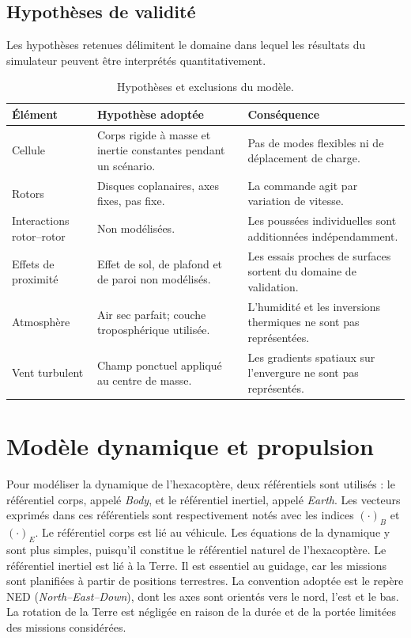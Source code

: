 \documentclass[11pt,a4paper,oneside]{report}
\begin{document}
	\section{Hypothèses de validité}
	Les hypothèses retenues délimitent le domaine dans lequel les résultats du simulateur peuvent être interprétés quantitativement.
	
	\begin{table}[H]
		\centering
		\caption{Hypothèses et exclusions du modèle.}
		\label{tab_hypotheses}
		\begin{tabularx}{\textwidth}{@{}L{4.1cm}Y L{3.2cm}@{}}
			\toprule
			\textbf{Élément} & \textbf{Hypothèse adoptée} & \textbf{Conséquence}\\
			\midrule
			Cellule & Corps rigide à masse et inertie constantes pendant un scénario. & Pas de modes flexibles ni de déplacement de charge.\\
			Rotors & Disques coplanaires, axes fixes, pas fixe. & La commande agit par variation de vitesse.\\
			Interactions rotor--rotor & Non modélisées. & Les poussées individuelles sont additionnées indépendamment.\\
			Effets de proximité & Effet de sol, de plafond et de paroi non modélisés. & Les essais proches de surfaces sortent du domaine de validation.\\
			Atmosphère & Air sec parfait; couche troposphérique utilisée. & L'humidité et les inversions thermiques ne sont pas représentées.\\
			Vent turbulent & Champ ponctuel appliqué au centre de masse. & Les gradients spatiaux sur l'envergure ne sont pas représentés.\\
			\bottomrule
		\end{tabularx}
	\end{table}
	
	\chapter{Modèle dynamique et propulsion}
	\label{chap_dynamique}
	Pour modéliser la dynamique de l'hexacoptère, deux référentiels sont utilisés : le référentiel corps, appelé \textit{Body}, et le référentiel inertiel, appelé \textit{Earth}.
	Les vecteurs exprimés dans ces référentiels sont respectivement notés avec les indices $(\cdot)_B$ et $(\cdot)_E$. Le référentiel corps est lié au véhicule. Les équations de la dynamique y sont plus simples, puisqu'il constitue le référentiel naturel de l'hexacoptère.
	Le référentiel inertiel est lié à la Terre. Il est essentiel au guidage, car les missions sont planifiées à partir de positions terrestres. La convention adoptée est le repère NED (\textit{North--East--Down}), dont les axes sont orientés vers le nord, l'est et le bas. La rotation de la Terre est négligée en raison de la durée et de la portée limitées des missions considérées. 
	
\end{document}
